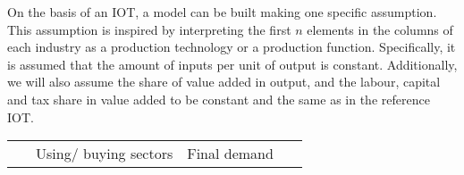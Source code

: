 \documentclass[12pt,english]{article}
\begin{document}
On the basis of an IOT, a model can be built making one specific assumption. This assumption is inspired by interpreting the first $n$ elements in the columns of each industry as a production technology or a production function. Specifically, it is assumed that the amount of inputs per unit of output is constant. Additionally, we will also assume the share of value added in output, and the labour, capital and tax share in value added to be constant and the same as in the reference IOT.

\begin{table}[!t]
	\centering
	\begin{adjustbox}{width=\textwidth}
		\renewcommand*{\arraystretch}{1.15}
		\small
		\begin{tabular}{cr|ccccc|b{30pt}b{30pt}p{30pt}b{30pt}b{30pt}|c|c}
			\multicolumn{2}{c}{\ }		& \multicolumn{5}{c}{Using/ buying sectors} & \multicolumn{5}{c}{Final demand}  &  \multicolumn{2}{c}{\ }	   \\
			

\end{tabular}
\end{adjustbox}
\end{table}
\end{document}
